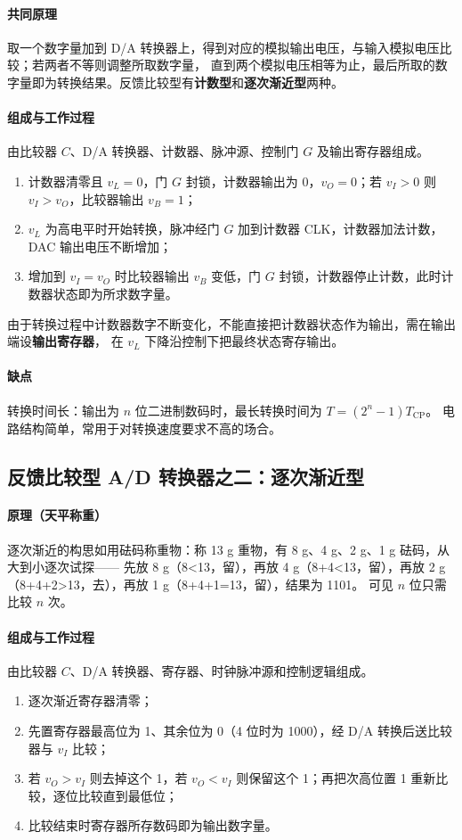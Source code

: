 \paragraph{共同原理}
取一个数字量加到 D/A 转换器上，得到对应的模拟输出电压，与输入模拟电压比较；若两者不等则调整所取数字量，
直到两个模拟电压相等为止，最后所取的数字量即为转换结果。反馈比较型有\textbf{计数型}和\textbf{逐次渐近型}两种。

\paragraph{组成与工作过程}
由比较器 $C$、D/A 转换器、计数器、脉冲源、控制门 $G$ 及输出寄存器组成。
\begin{enumerate}
    \item 计数器清零且 $v_L=0$，门 $G$ 封锁，计数器输出为 0，$v_O=0$；若 $v_I>0$ 则 $v_I>v_O$，比较器输出 $v_B=1$；
    \item $v_L$ 为高电平时开始转换，脉冲经门 $G$ 加到计数器 CLK，计数器加法计数，DAC 输出电压不断增加；
    \item 增加到 $v_I=v_O$ 时比较器输出 $v_B$ 变低，门 $G$ 封锁，计数器停止计数，此时计数器状态即为所求数字量。
\end{enumerate}
由于转换过程中计数器数字不断变化，不能直接把计数器状态作为输出，需在输出端设\textbf{输出寄存器}，
在 $v_L$ 下降沿控制下把最终状态寄存输出。

\paragraph{缺点}
转换时间长：输出为 $n$ 位二进制数码时，最长转换时间为 $T=(2^n-1)T_\text{CP}$。
电路结构简单，常用于对转换速度要求不高的场合。

\subsection{反馈比较型 A/D 转换器之二：逐次渐近型}
\paragraph{原理（天平称重）}
逐次渐近的构思如用砝码称重物：称 13 g 重物，有 8 g、4 g、2 g、1 g 砝码，从大到小逐次试探——
先放 8 g（8<13，留），再放 4 g（8+4<13，留），再放 2 g（8+4+2>13，去），再放 1 g（8+4+1=13，留），结果为 1101。
可见 $n$ 位只需比较 $n$ 次。

\paragraph{组成与工作过程}
由比较器 $C$、D/A 转换器、寄存器、时钟脉冲源和控制逻辑组成。
\begin{enumerate}
    \item 逐次渐近寄存器清零；
    \item 先置寄存器最高位为 1、其余位为 0（4 位时为 1000），经 D/A 转换后送比较器与 $v_I$ 比较；
    \item 若 $v_O>v_I$ 则去掉这个 1，若 $v_O<v_I$ 则保留这个 1；再把次高位置 1 重新比较，逐位比较直到最低位；
    \item 比较结束时寄存器所存数码即为输出数字量。
\end{enumerate}

